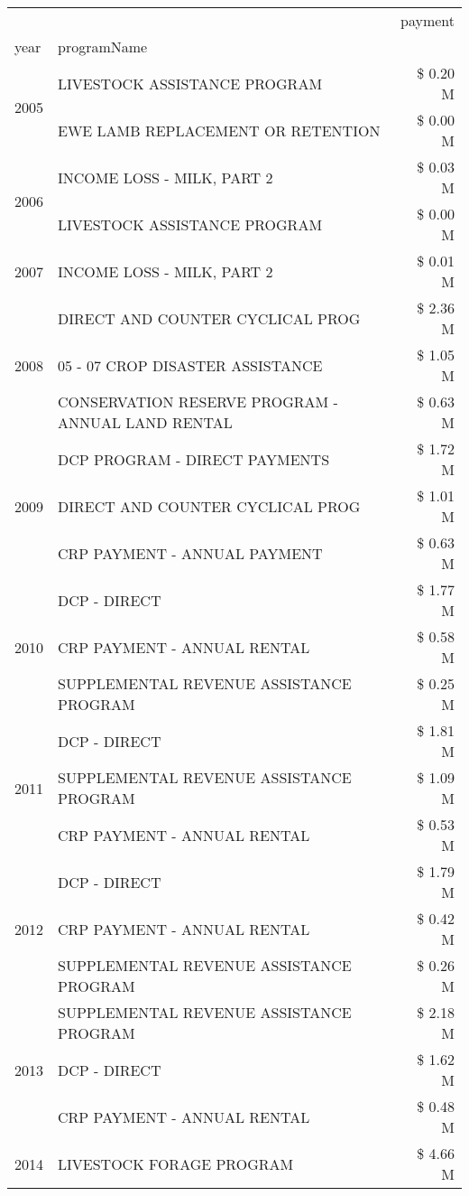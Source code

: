 \begin{tabular}{llr}
\toprule
 &  & payment \\
year & programName &  \\
\midrule
\multirow[t]{2}{*}{2005} & LIVESTOCK ASSISTANCE PROGRAM & \$ 0.20 M \\
 & EWE LAMB REPLACEMENT OR RETENTION & \$ 0.00 M \\
\cline{1-3}
\multirow[t]{2}{*}{2006} & INCOME LOSS - MILK, PART 2 & \$ 0.03 M \\
 & LIVESTOCK ASSISTANCE PROGRAM & \$ 0.00 M \\
\cline{1-3}
2007 & INCOME LOSS - MILK, PART 2 & \$ 0.01 M \\
\cline{1-3}
\multirow[t]{3}{*}{2008} & DIRECT AND COUNTER CYCLICAL PROG & \$ 2.36 M \\
 & 05 - 07 CROP DISASTER ASSISTANCE & \$ 1.05 M \\
 & CONSERVATION RESERVE PROGRAM - ANNUAL LAND RENTAL & \$ 0.63 M \\
\cline{1-3}
\multirow[t]{3}{*}{2009} & DCP PROGRAM - DIRECT PAYMENTS & \$ 1.72 M \\
 & DIRECT AND COUNTER CYCLICAL PROG & \$ 1.01 M \\
 & CRP PAYMENT - ANNUAL PAYMENT & \$ 0.63 M \\
\cline{1-3}
\multirow[t]{3}{*}{2010} & DCP - DIRECT & \$ 1.77 M \\
 & CRP PAYMENT - ANNUAL RENTAL & \$ 0.58 M \\
 & SUPPLEMENTAL REVENUE ASSISTANCE PROGRAM & \$ 0.25 M \\
\cline{1-3}
\multirow[t]{3}{*}{2011} & DCP - DIRECT & \$ 1.81 M \\
 & SUPPLEMENTAL REVENUE ASSISTANCE PROGRAM & \$ 1.09 M \\
 & CRP PAYMENT - ANNUAL RENTAL & \$ 0.53 M \\
\cline{1-3}
\multirow[t]{3}{*}{2012} & DCP - DIRECT & \$ 1.79 M \\
 & CRP PAYMENT - ANNUAL RENTAL & \$ 0.42 M \\
 & SUPPLEMENTAL REVENUE ASSISTANCE PROGRAM & \$ 0.26 M \\
\cline{1-3}
\multirow[t]{3}{*}{2013} & SUPPLEMENTAL REVENUE ASSISTANCE PROGRAM & \$ 2.18 M \\
 & DCP - DIRECT & \$ 1.62 M \\
 & CRP PAYMENT - ANNUAL RENTAL & \$ 0.48 M \\
\cline{1-3}
\multirow[t]{3}{*}{2014} & LIVESTOCK FORAGE PROGRAM & \$ 4.66 M \\

\end{tabular}
